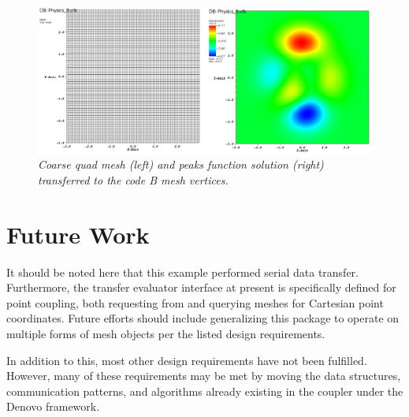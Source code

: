 \documentclass[letterpaper]{article}
\begin{document}
\begin{figure}[htpb!]
  \begin{center}
    \includegraphics[width=6in]{images/sol_B.png}
  \end{center}
  \caption{\small \sl Coarse quad mesh (left) and peaks
    function solution (right) transferred to the code B mesh
    vertices.}
  \label{fig:sol_B}
\end{figure}

\section{Future Work}
It should be noted here that this example performed serial data
transfer. Furthermore, the transfer evaluator interface at present is
specifically defined for point coupling, both requesting from and
querying meshes for Cartesian point coordinates. Future efforts should
include generalizing this package to operate on multiple forms of mesh
objects per the listed design requirements.

In addition to this, most other design requirements have not been
fulfilled. However, many of these requirements may be met by moving
the data structures, communication patterns, and algorithms already
existing in the coupler under the Denovo framework.

\appendix
\end{document}
